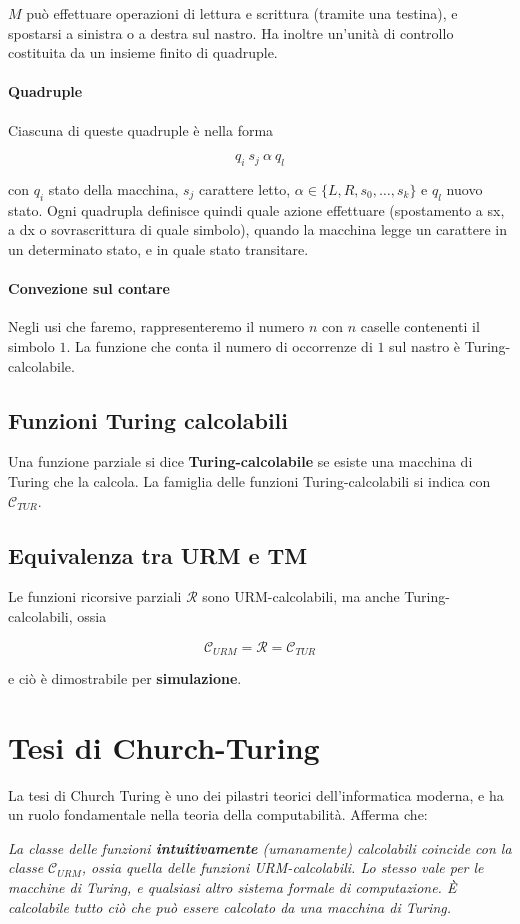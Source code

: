	$M$ può effettuare operazioni di lettura e scrittura (tramite una testina), e spostarsi a sinistra o a destra sul nastro. Ha inoltre un'unità di controllo costituita da un insieme finito di quadruple.
	
	\paragraph{Quadruple} Ciascuna di queste quadruple è nella forma
	
	$$
	q_i \ s_j \ \alpha \ q_l
	$$
	
	con $q_i$ stato della macchina, $s_j$ carattere letto, $\alpha \in \{L, R, s_0, \dots, s_k\}$ e $q_l$ nuovo stato. Ogni quadrupla definisce quindi quale azione effettuare (spostamento a sx, a dx o sovrascrittura di quale simbolo), quando la macchina legge un carattere in un determinato stato, e in quale stato transitare.
	
	\paragraph{Convezione sul contare} Negli usi che faremo, rappresenteremo il numero $n$ con $n$ caselle contenenti il simbolo $1$. La funzione che conta il numero di occorrenze di $1$ sul nastro è Turing-calcolabile.
	
	\subsection{Funzioni Turing calcolabili}
	Una funzione parziale si dice \textbf{Turing-calcolabile} se esiste una macchina di Turing che la calcola. La famiglia delle funzioni Turing-calcolabili si indica con $\mathcal{C}_{TUR}$.
	
	\subsection{Equivalenza tra URM e TM}
	Le funzioni ricorsive parziali $\mathcal R$ sono URM-calcolabili, ma anche Turing-calcolabili, ossia
	
	$$
	\mathcal{C}_{URM} = \mathcal{R}= \mathcal{C}_{TUR}
	$$
	
	e ciò è dimostrabile per \textbf{simulazione}.
	
	\newpage
	
	\section{Tesi di Church-Turing}
	La tesi di Church Turing è uno dei pilastri teorici dell'informatica moderna, e ha un ruolo fondamentale nella teoria della computabilità.
	Afferma che:
	\begin{center}
	\textit{La classe delle funzioni \textbf{intuitivamente} (umanamente) calcolabili coincide con la classe $\mathcal{C}_{URM}$, ossia quella delle funzioni URM-calcolabili. Lo stesso vale per le macchine di Turing, e qualsiasi altro sistema formale di computazione. È calcolabile tutto ciò che può essere calcolato da una macchina di Turing.}
	\end{center}
	
